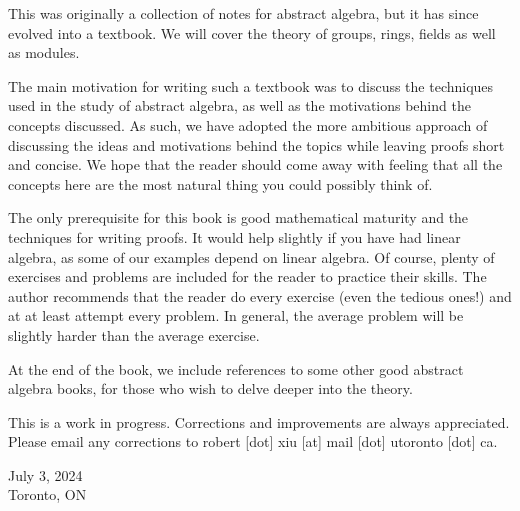 \documentclass[./algebra-notes.tex]{subfiles}
\begin{document}
This was originally a collection of notes for abstract algebra, but it has since
evolved into a textbook. We will cover the theory of groups, rings, fields as
well as modules. 

The main motivation for writing such a textbook was to discuss the techniques
used in the study of abstract algebra, as well as the motivations behind the
concepts discussed. As such, we have adopted the more ambitious approach of
discussing the ideas and motivations behind the topics while leaving proofs
short and concise. We hope that the reader should come away with feeling that
all the concepts here are the most natural thing you could possibly think of.

The only prerequisite for this book is good mathematical maturity and the
techniques for writing proofs. It would help slightly if you have had
linear algebra, as some of our examples depend on linear algebra. Of course,
plenty of exercises and problems are included for the reader to practice
their skills. The author recommends that the reader do every exercise (even
the tedious ones!) and at at least attempt every problem. In general, the
average problem will be slightly harder than the average exercise.

At the end of the book, we include references to some other good abstract
algebra books, for those who wish to delve deeper into the theory.

This is a work in progress. Corrections and improvements are always
appreciated. Please email any corrections to robert [dot] xiu [at] mail
[dot] utoronto [dot] ca. 

July 3, 2024\\
Toronto, ON
\end{document}
